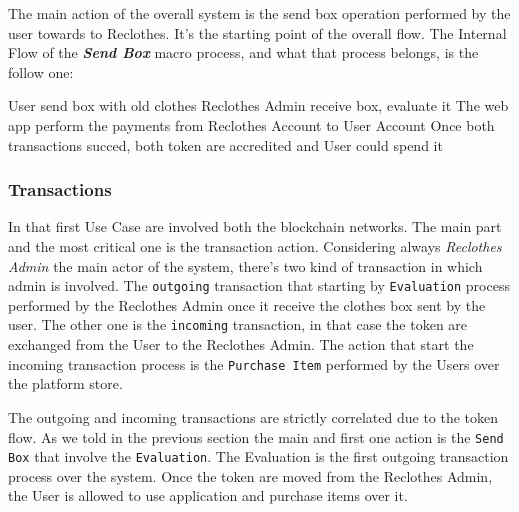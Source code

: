 The main action of the overall system is the send box operation performed by the user towards to Reclothes.
It's the starting point of the overall flow. The Internal Flow of the \textit{\bf{Send Box}} macro 
process, and what that process belongs, is the follow one:

\begin{outline}[enumerate]
    \1 User send box with old clothes
    \1 Reclothes Admin receive box, evaluate it
    \1 The web app perform the payments from Reclothes Account to User Account
    \1 Once both transactions succed, both token are accredited and User could spend it
\end{outline}

\subsubsection{Transactions}

In that first Use Case are involved both the blockchain networks. The main part and the most critical
one is the transaction action. Considering always \textit{Reclothes Admin} the
main actor of the system, there's two kind of transaction in which admin is involved. 
The \texttt{outgoing} transaction that starting by \texttt{Evaluation} process performed by the Reclothes Admin
once it receive the clothes box sent by the user. The other one is the \texttt{incoming} transaction,
in that case the token are exchanged from the User to the Reclothes Admin. The action that start
the incoming transaction process is the \texttt{Purchase Item} performed by the Users over the platform store.
\bigskip

The outgoing and incoming transactions are strictly correlated due to the token flow. As we told in the 
previous section the main and first one action is the \texttt{Send Box} that involve the \texttt{Evaluation}.
The Evaluation is the first outgoing transaction process over the system. Once the token are moved from the Reclothes Admin,
the User is allowed to use application and purchase items over it. 

